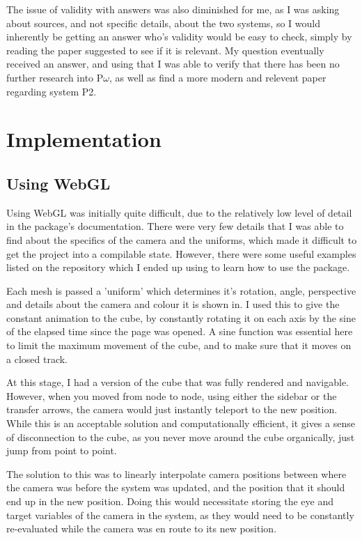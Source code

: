 \documentclass{l4proj}
\begin{document}
The issue of validity with answers was also diminished for me, as I was asking about sources, and not specific details, about the two systems, so I would inherently be getting an answer who's validity would be easy to check, simply by reading the paper suggested to see if it is relevant.  My question eventually received an answer, and using that I was able to verify that there has been no further research into P\underline{$\omega$}, as well as find a more modern and relevent paper regarding system P2.


\chapter{Implementation}


\section{Using WebGL}

Using WebGL was initially quite difficult, due to the relatively low level of detail in the package's documentation.  There were very few details that I was able to find about the specifics of the camera and the uniforms, which made it difficult to get the project into a compilable state.  However, there were some useful examples listed on the repository which I ended up using to learn how to use the package.

Each mesh is passed a 'uniform' which determines it's rotation, angle, perspective and details about the camera and colour it is shown in.  I used this to give the constant animation to the cube, by constantly rotating it on each axis by the sine of the elapsed time since the page was opened.  A sine function was essential here to limit the maximum movement of the cube, and to make sure that it moves on a closed track.

At this stage, I had a version of the cube that was fully rendered and navigable.  However, when you moved from node to node, using either the sidebar or the transfer arrows, the camera would just instantly teleport to the new position.  While this is an acceptable solution and computationally efficient, it gives a sense of disconnection to the cube, as you never move around the cube organically, just jump from point to point.

The solution to this was to linearly interpolate camera positions between where the camera was before the system was updated, and the position that it should end up in the new position.  Doing this would necessitate storing the eye and target variables of the camera in the system, as they would need to be constantly re-evaluated while the camera was en route to its new position.
\end{document}
